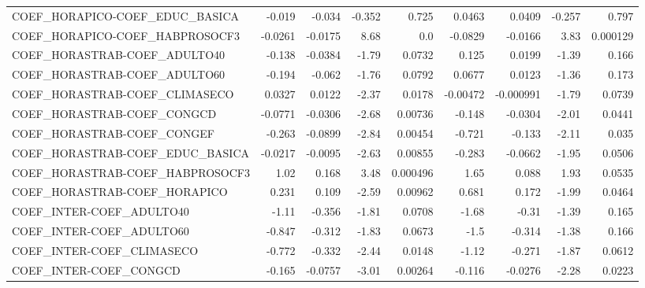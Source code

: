 \begin{tabular}{lrrrrrrrr}
COEF\_HORAPICO-COEF\_EDUC\_BASICA      &      -0.019 &       -0.034 &  -0.352 &    0.725 &     0.0463 &      0.0409 &       -0.257 &         0.797 \\
COEF\_HORAPICO-COEF\_HABPROSOCF3      &     -0.0261 &      -0.0175 &    8.68 &      0.0 &    -0.0829 &     -0.0166 &         3.83 &      0.000129 \\
COEF\_HORASTRAB-COEF\_ADULTO40        &      -0.138 &      -0.0384 &   -1.79 &   0.0732 &      0.125 &      0.0199 &        -1.39 &         0.166 \\
COEF\_HORASTRAB-COEF\_ADULTO60        &      -0.194 &       -0.062 &   -1.76 &   0.0792 &     0.0677 &      0.0123 &        -1.36 &         0.173 \\
COEF\_HORASTRAB-COEF\_CLIMASECO       &      0.0327 &       0.0122 &   -2.37 &   0.0178 &   -0.00472 &   -0.000991 &        -1.79 &        0.0739 \\
COEF\_HORASTRAB-COEF\_CONGCD          &     -0.0771 &      -0.0306 &   -2.68 &  0.00736 &     -0.148 &     -0.0304 &        -2.01 &        0.0441 \\
COEF\_HORASTRAB-COEF\_CONGEF          &      -0.263 &      -0.0899 &   -2.84 &  0.00454 &     -0.721 &      -0.133 &        -2.11 &         0.035 \\
COEF\_HORASTRAB-COEF\_EDUC\_BASICA     &     -0.0217 &      -0.0095 &   -2.63 &  0.00855 &     -0.283 &     -0.0662 &        -1.95 &        0.0506 \\
COEF\_HORASTRAB-COEF\_HABPROSOCF3     &        1.02 &        0.168 &    3.48 & 0.000496 &       1.65 &       0.088 &         1.93 &        0.0535 \\
COEF\_HORASTRAB-COEF\_HORAPICO        &       0.231 &        0.109 &   -2.59 &  0.00962 &      0.681 &       0.172 &        -1.99 &        0.0464 \\
COEF\_INTER-COEF\_ADULTO40            &       -1.11 &       -0.356 &   -1.81 &   0.0708 &      -1.68 &       -0.31 &        -1.39 &         0.165 \\
COEF\_INTER-COEF\_ADULTO60            &      -0.847 &       -0.312 &   -1.83 &   0.0673 &       -1.5 &      -0.314 &        -1.38 &         0.166 \\
COEF\_INTER-COEF\_CLIMASECO           &      -0.772 &       -0.332 &   -2.44 &   0.0148 &      -1.12 &      -0.271 &        -1.87 &        0.0612 \\
COEF\_INTER-COEF\_CONGCD              &      -0.165 &      -0.0757 &   -3.01 &  0.00264 &     -0.116 &     -0.0276 &        -2.28 &        0.0223 \\

\end{tabular}
